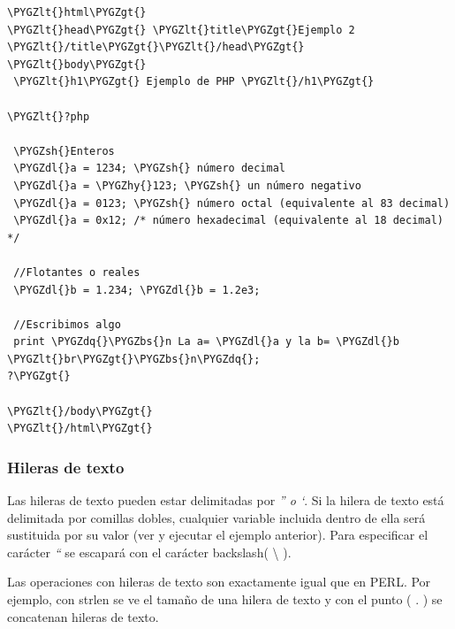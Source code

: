 \documentclass[a5paper,10pt,spanish]{sphinxmanual}
\def\PYGZbs{\char`\\}
\def\PYGZlt{\char`\<}
\def\PYGZgt{\char`\>}
\def\PYGZsh{\char`\#}
\def\PYGZdl{\char`\$}
\def\PYGZhy{\char`\-}
\def\PYGZdq{\char`\"}
\begin{document}
\begin{Verbatim}[commandchars=\\\{\}]
\PYGZlt{}html\PYGZgt{}
\PYGZlt{}head\PYGZgt{} \PYGZlt{}title\PYGZgt{}Ejemplo 2 \PYGZlt{}/title\PYGZgt{}\PYGZlt{}/head\PYGZgt{}
\PYGZlt{}body\PYGZgt{}
 \PYGZlt{}h1\PYGZgt{} Ejemplo de PHP \PYGZlt{}/h1\PYGZgt{}

\PYGZlt{}?php

 \PYGZsh{}Enteros
 \PYGZdl{}a = 1234; \PYGZsh{} número decimal
 \PYGZdl{}a = \PYGZhy{}123; \PYGZsh{} un número negativo
 \PYGZdl{}a = 0123; \PYGZsh{} número octal (equivalente al 83 decimal)
 \PYGZdl{}a = 0x12; /* número hexadecimal (equivalente al 18 decimal) */

 //Flotantes o reales
 \PYGZdl{}b = 1.234; \PYGZdl{}b = 1.2e3;

 //Escribimos algo
 print \PYGZdq{}\PYGZbs{}n La a= \PYGZdl{}a y la b= \PYGZdl{}b \PYGZlt{}br\PYGZgt{}\PYGZbs{}n\PYGZdq{};
?\PYGZgt{}

\PYGZlt{}/body\PYGZgt{}
\PYGZlt{}/html\PYGZgt{}
\end{Verbatim}


\subsubsection{Hileras de texto}
\label{Tutorial1_Conceptos.md:hileras-de-texto}
Las hileras de texto pueden estar delimitadas por \emph{'' o `}. Si la hilera
de texto está delimitada por comillas dobles, cualquier variable
incluida dentro de ella será sustituida por su valor (ver y ejecutar el
ejemplo anterior). Para especificar el carácter \emph{``} se escapará con el
carácter backslash( \textbackslash{} ).

Las operaciones con hileras de texto son exactamente igual que en PERL.
Por ejemplo, con strlen se ve
el tamaño de una hilera de texto y con el punto ( . ) se concatenan
hileras de texto.
\end{document}
